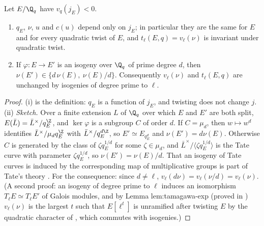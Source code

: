 \begin{proposition}\label{prop:reduction:tate-parameter-invariance}
Let $E/\Q_q$ have $v_q(j_E)<0$.
\begin{enumerate}[label=(\roman*)]
\item $q_E$, $\nu$, $u$ and $c(u)$ depend only on $j_E$; in particular they are the same for $E$ and for every quadratic twist of
$E$, and $t_\ell(E,q)=v_\ell(\nu)$ is invariant under quadratic twist.
\item If $\varphi\colon E\to E'$ is an isogeny over $\Q_q$ of prime degree $d$, then $\nu(E')\in\{d\,\nu(E),\ \nu(E)/d\}$. Consequently $v_\ell(\nu)$
and $t_\ell(E,q)$ are unchanged by isogenies of degree prime to $\ell$.
\end{enumerate}
\end{proposition}

\begin{proof}
(i) is the definition: $q_E$ is a function of $j_E$, and twisting does not change $j$.
(ii) \emph{Sketch.} Over a finite extension $L$ of $\Q_q$ over which $E$ and $E'$ are both split, $E(\bar L)=\bar L^\times/q_E^{\Z}$, and
$\ker\varphi$ is a subgroup $C$ of order $d$. If $C=\mu_d$, then $w\mapsto w^d$ identifies $\bar L^\times/\mu_dq_E^{\Z}$ with
$\bar L^\times/q_E^{d\Z}$, so $E'\simeq E_{q_E^d}$ and $\nu(E')=d\nu(E)$. Otherwise $C$ is generated by the class of $\zeta q_E^{1/d}$ for some
$\zeta\in\mu_d$, and $\bar L^\times/\langle\zeta q_E^{1/d}\rangle$ is the Tate curve with parameter $\zeta q_E^{1/d}$, so $\nu(E')=\nu(E)/d$. That
an isogeny of Tate curves is induced by the corresponding map of multiplicative groups is part of Tate's theory
\cite[V.3, V.5]{SilvermanATAEC}. For the consequence: since $d\ne\ell$, $v_\ell(d\nu)=v_\ell(\nu/d)=v_\ell(\nu)$. (A
second proof: an isogeny of degree prime to $\ell$ induces an isomorphism $T_\ell E\simeq T_\ell E'$ of Galois modules, and
by Lemma lem:tamagawa-exp (proved in ) $v_\ell(\nu)$ is the largest $t$ such that $E[\ell^t]$ is unramified after twisting
$E$ by the quadratic character of , which commutes with isogenies.)
\end{proof}

